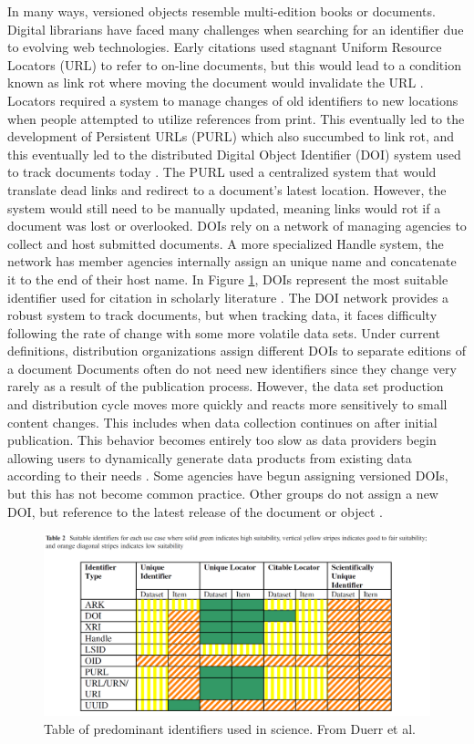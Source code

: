 In many ways, versioned objects resemble multi-edition books or documents.
Digital librarians have faced many challenges when searching for an identifier due to evolving web technologies.
Early citations used stagnant Uniform Resource Locators (URL) to refer to on-line documents, but this would lead to a condition known as link rot where moving the document would invalidate the URL \cite{Lyons2005}.
Locators required a system to manage changes of old identifiers to new locations when people attempted to utilize references from print.
This eventually led to the development of Persistent URLs (PURL) which also succumbed to link rot, and this eventually led to the distributed Digital Object Identifier (DOI) system used to track documents today \cite{Duerr2011}.
The PURL used a centralized system that would translate dead links and redirect to a document's latest location.
However, the system would still need to be manually updated, meaning links would rot if a document was lost or overlooked.
DOIs rely on a network of managing agencies to collect and host submitted documents.
A more specialized Handle system, the network has member agencies internally assign an unique name and concatenate it to the end of their host name.
In Figure \ref{table:Duerr}, DOIs represent the most suitable identifier used for citation in scholarly literature \cite{Duerr2011}.
The DOI network provides a robust system to track documents, but when tracking data, it faces difficulty following the rate of change with some more volatile data sets.
Under current definitions, distribution organizations assign different DOIs to separate editions of a document
Documents often do not need new identifiers since they change very rarely as a result of the publication process.
However, the data set production and distribution cycle moves more quickly and reacts more sensitively to small content changes.
This includes when data collection continues on after initial publication.
This behavior becomes entirely too slow as data providers begin allowing users to dynamically generate data products from existing data according to their needs \cite{Barkstrom2003a}.
Some agencies have begun assigning versioned DOIs, but this has not become common practice.
Other groups do not assign a new DOI, but reference to the latest release of the document or object \cite{Ands2017}.

\begin{figure}
	\centering
	\includegraphics[scale=0.30]{figures/DigitalIdentifierTable.png}
	\caption{Table of predominant identifiers used in science.  From Duerr et al. \cite{Duerr2011}}
	\label{table:Duerr}
\end{figure}

